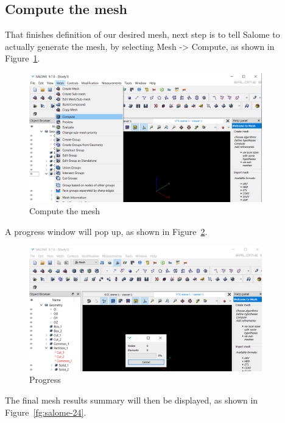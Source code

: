 \subsection{Compute the mesh}

That finishes definition of our desired mesh, next step is to tell Salome to actually generate the mesh, by selecting Mesh -> Compute, as shown in Figure~\ref{fg:salome-22}.

\begin{figure}[H]
\centering
\includegraphics[width=0.9\textwidth]{Salome-22}
\caption{Compute the mesh}\label{fg:salome-22}
\end{figure}

A progress window will pop up, as shown in Figure~\ref{fg:salome-23}.

\begin{figure}[H]
\centering
\includegraphics[width=0.9\textwidth]{Salome-23}
\caption{Progress}\label{fg:salome-23}
\end{figure}

The final mesh results summary will then be displayed, as shown in Figure~\ref{fg:salome-24}.

